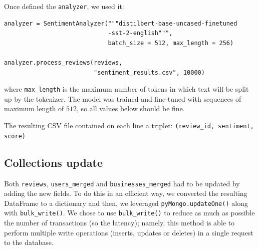 \documentclass{Configuration_Files/PoliMi3i_thesis}
\begin{document}
Once defined the \texttt{analyzer}, we used it:

\bigskip

\begin{verbatim}
analyzer = SentimentAnalyzer("""distilbert-base-uncased-finetuned
                             -sst-2-english""", 
                             batch_size = 512, max_length = 256)

analyzer.process_reviews(reviews, 
                         "sentiment_results.csv", 10000)
\end{verbatim}

\bigskip

where \texttt{max\_length} is the maximum number of tokens in which text will be split up by the tokenizer. The model was trained and fine-tuned with sequences of maximum length of $512$, so all values below should be fine. 

The resulting CSV file contained on each line a triplet: \texttt{(review\_id, sentiment, \\score)}

\subsection{Collections update}
Both \texttt{reviews}, \texttt{users\_merged} and \texttt{businesses\_merged} had to be updated by adding the new fields. To do this in an efficient way, we converted the resulting DataFrame to a dictionary and then, we leveraged  \texttt{pyMongo.updateOne()} along with \texttt{bulk\_write()}. We chose to use \texttt{bulk\_write()} to reduce as much as possible the number of transactions (so the latency); namely, this method is able to perform multiple write operations (inserts, updates or deletes) in a single request to the database. 
\end{document}
